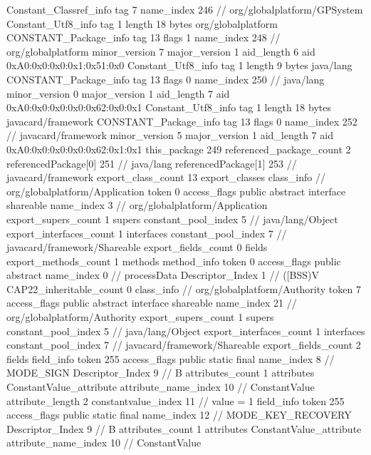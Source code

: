 {{{		}
		Constant_Classref_info {
			tag	7
			name_index	246		// org/globalplatform/GPSystem
		}
		Constant_Utf8_info {
			tag	1
			length	18
			bytes	org/globalplatform
		}
		CONSTANT_Package_info {
			tag	13
			flags	1
			name_index	248		// org/globalplatform
			minor_version	7
			major_version	1
			aid_length	6
			aid	0xA0:0x0:0x0:0x1:0x51:0x0
		}
		Constant_Utf8_info {
			tag	1
			length	9
			bytes	java/lang
		}
		CONSTANT_Package_info {
			tag	13
			flags	0
			name_index	250		// java/lang
			minor_version	0
			major_version	1
			aid_length	7
			aid	0xA0:0x0:0x0:0x0:0x62:0x0:0x1
		}
		Constant_Utf8_info {
			tag	1
			length	18
			bytes	javacard/framework
		}
		CONSTANT_Package_info {
			tag	13
			flags	0
			name_index	252		// javacard/framework
			minor_version	5
			major_version	1
			aid_length	7
			aid	0xA0:0x0:0x0:0x0:0x62:0x1:0x1
		}
	}
	this_package	249
	referenced_package_count	2
	referencedPackage[0]	251		// java/lang
	referencedPackage[1]	253		// javacard/framework
	export_class_count	13
	export_classes {
		class_info {		// org/globalplatform/Application
			token	0
			access_flags	public abstract interface shareable
			name_index	3		// org/globalplatform/Application
			export_supers_count	1
			supers {
				constant_pool_index	5		// java/lang/Object
			}
			export_interfaces_count	1
			interfaces {
				constant_pool_index	7		// javacard/framework/Shareable
			}
			export_fields_count	0
			fields {
			}
			export_methods_count	1
			methods {
				method_info {
					token	0
					access_flags	public abstract
					name_index	0		// processData
					Descriptor_Index	1		// ([BSS)V
				}
			}
			CAP22_inheritable_count	0
		}
		class_info {		// org/globalplatform/Authority
			token	7
			access_flags	public abstract interface shareable
			name_index	21		// org/globalplatform/Authority
			export_supers_count	1
			supers {
				constant_pool_index	5		// java/lang/Object
			}
			export_interfaces_count	1
			interfaces {
				constant_pool_index	7		// javacard/framework/Shareable
			}
			export_fields_count	2
			fields {
			field_info {
				token	255
				access_flags	public static final
				name_index	8		// MODE_SIGN
				Descriptor_Index	9		// B
				attributes_count	1
				attributes {
				ConstantValue_attribute {
					attribute_name_index	10		// ConstantValue
					attribute_length	2
					constantvalue_index	11		// value = 1
				}
				}
			}
			field_info {
				token	255
				access_flags	public static final
				name_index	12		// MODE_KEY_RECOVERY
				Descriptor_Index	9		// B
				attributes_count	1
				attributes {
				ConstantValue_attribute {
					attribute_name_index	10		// ConstantValue
}}}}}}}

